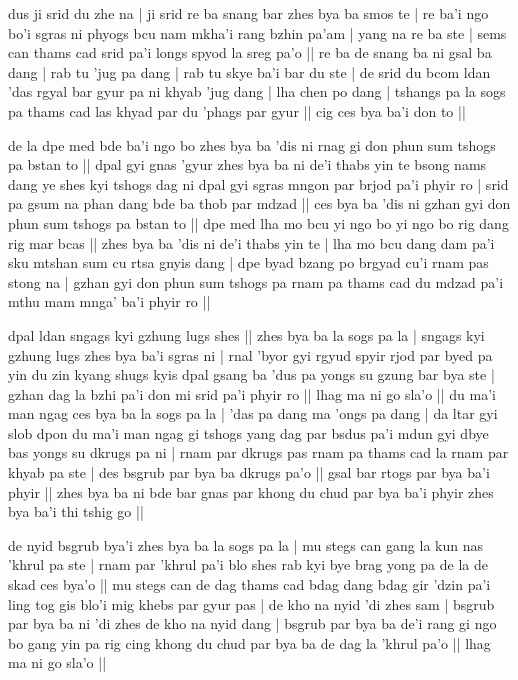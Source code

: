 \documentclass[11pt,twoside]{article}\makeatletter
\begin{document}
\label{TV1.3}dus ji srid du zhe na | ji srid re ba snang bar zhes bya ba smos te | re ba'i ngo bo'i sgras ni phyogs bcu nam mkha'i rang bzhin pa'am | yang na re ba ste | sems can thams cad srid pa'i longs spyod la sreg pa'o || re ba de snang ba ni gsal ba dang | rab tu 'jug pa dang | rab tu skye ba'i bar du ste | de srid du bcom ldan 'das rgyal bar gyur pa ni khyab 'jug dang | lha chen po dang | tshangs pa la sogs pa thams cad las khyad par du 'phags par gyur  || cig ces bya ba'i don to ||\par
\label{TV1.4}de la dpe med bde ba'i ngo bo zhes bya ba 'dis ni rnag gi don phun sum tshogs pa bstan to || dpal gyi gnas 'gyur zhes bya ba ni de'i thabs yin te bsong nams dang ye shes kyi tshogs dag ni dpal gyi sgras mngon par brjod pa'i phyir ro | srid pa gsum na phan dang bde ba thob par mdzad || ces bya ba 'dis ni gzhan gyi don phun sum tshogs pa bstan to || dpe med lha mo bcu yi ngo bo yi ngo bo rig dang rig mar bcas || zhes bya ba 'dis ni de'i thabs yin te | lha mo bcu dang dam pa'i sku mtshan sum cu rtsa gnyis dang | dpe byad bzang po brgyad cu'i rnam pas stong na | gzhan gyi don phun sum tshogs pa rnam pa thams cad du mdzad pa'i mthu mam mnga' ba'i phyir ro || 
\par
\label{TV2}dpal ldan sngags kyi gzhung lugs shes || zhes bya ba la sogs pa la | sngags kyi gzhung lugs zhes bya ba'i sgras ni | rnal 'byor gyi rgyud spyir rjod par byed pa yin du zin kyang shugs kyis dpal gsang ba 'dus pa yongs su gzung bar bya ste | gzhan dag la bzhi pa'i don mi srid pa'i phyir ro || lhag ma ni go sla'o || du ma'i man ngag ces bya ba la sogs pa la | 'das pa dang ma 'ongs pa dang | da ltar gyi slob dpon du ma'i man ngag gi tshogs yang dag par bsdus pa'i mdun gyi dbye bas yongs su dkrugs pa ni | rnam par dkrugs pas rnam pa thams cad la rnam par khyab pa ste | des bsgrub par bya ba dkrugs pa'o || gsal bar rtogs par bya ba'i phyir || zhes bya ba ni bde bar gnas par khong du chud par bya ba'i phyir zhes bya ba'i thi tshig go || 
\par
\label{TV3.1}de nyid bsgrub bya'i zhes bya ba la sogs pa la | mu stegs can gang la kun nas 'khrul pa ste | rnam par 'khrul pa'i blo shes rab kyi bye brag yong pa de la de skad ces bya'o || mu stegs can de dag thams cad bdag dang bdag gir 'dzin pa'i ling tog gis blo'i mig khebs par gyur pas | de kho na nyid 'di zhes sam | bsgrub par bya ba ni 'di zhes de kho na nyid dang | bsgrub par bya ba de'i rang gi ngo bo gang yin pa rig cing khong du chud par bya ba de dag la 'khrul pa'o || lhag ma ni go sla'o || \par
\end{document}
